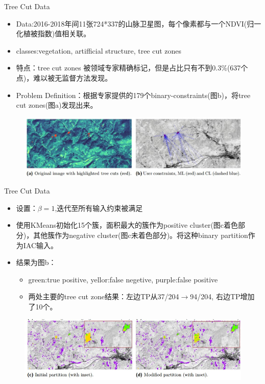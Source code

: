 \documentclass{beamer}
\begin{document}
\begin{frame}{Tree Cut Data}
    \begin{itemize}
        \item Data:2016-2018年间11张724*337的山脉卫星图，每个像素都与一个NDVI(归一化植被指数)值相关联。
        \item classes:vegetation, artifficial structure, tree cut zones
        \item 特点：tree cut zones 被领域专家精确标记，但是占比只有不到0.3\%(637个点)，难以被无监督方法发现。
        \item Problem Definition：根据专家提供的179个binary-constraints(图b)，将tree cut zones(图a)发现出来。
    \end{itemize}
    \begin{figure}
        \centering
        \includegraphics[width=0.8\linewidth]{./images/ab.jpg}
    \end{figure}
    
\end{frame}
\begin{frame}{Tree Cut Data}
    \begin{itemize}
        \item 设置：$\beta=1$,迭代至所有输入约束被满足
        \item 使用KMeans初始化15个簇，面积最大的簇作为positive cluster(图c着色部分)，其他簇作为negative cluster(图c未着色部分)。将这种binary partition作为IAC输入。
        \item 结果为图b：
        \begin{itemize}
            \item green:true positive, yellor:false negetive, purple:false positive
            \item 两处主要的tree cut zone结果：左边TP从37/204$\rightarrow$94/204, 右边TP增加了10个。
        \end{itemize}
    \end{itemize}

    \begin{figure}
        \centering
        \includegraphics[width=0.8\linewidth]{./images/result.jpg}
    \end{figure}
\end{frame}
\end{document}
